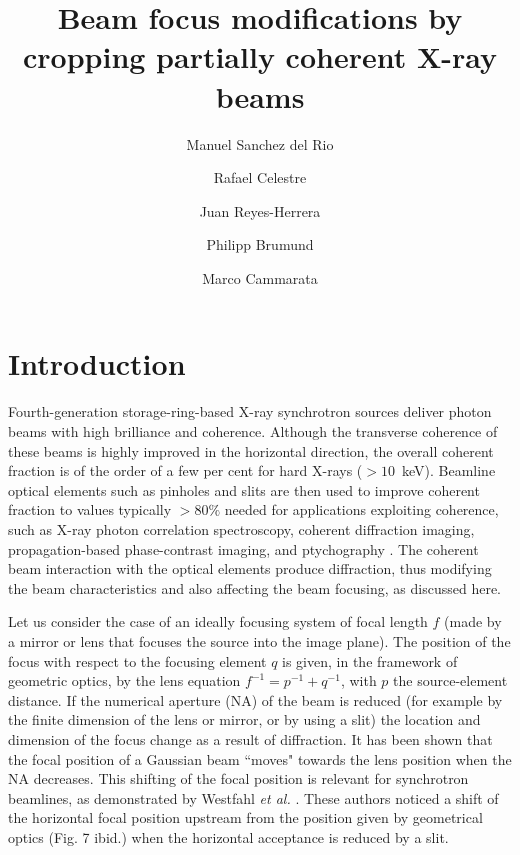 \documentclass[9pt,twocolumn,twoside]{osajnl}
\title{Beam focus modifications by cropping partially coherent X-ray beams}
\author[1*]{Manuel Sanchez del Rio}
\author[1]{Rafael Celestre}
\author[1]{Juan Reyes-Herrera}
\author[1]{Philipp Brumund}
\author[1]{Marco Cammarata}
\affil[1]{European Synchrotron Radiation Facility, 71 Avenue des Martyrs, 38000 Grenoble}
\affil[*]{Corresponding author: srio@esrf.eu}
\begin{document}
\maketitle

\section{Introduction}
\label{sec:introduction}
Fourth-generation storage-ring-based X-ray synchrotron sources deliver photon beams with high brilliance and coherence. Although the transverse coherence of these beams is highly improved in the horizontal direction, 
the overall coherent fraction is of the order of a few per cent for hard X-rays ($>10$~keV). Beamline optical elements such as pinholes and slits are then used to improve coherent fraction to values typically $>80 \%$ needed for applications exploiting coherence, such as X-ray photon correlation spectroscopy, coherent diffraction imaging, propagation-based phase-contrast imaging, and ptychography \cite{paganin_book}. The coherent beam interaction with the optical elements produce diffraction, thus modifying the beam characteristics and also affecting the beam focusing, as discussed here.

Let us consider the case of an ideally focusing system of focal length $f$ (made by a mirror or lens that focuses the source into the image plane). The position of the focus with respect to the focusing element $q$ is given, in the framework of geometric optics, by the lens equation $f^{-1}=p^{-1}+q^{-1}$, with $p$ the source-element distance. If the numerical aperture (NA) of the beam is reduced (for example by the finite dimension of the lens or mirror, or by using a slit) the location and dimension of the focus change as a result of diffraction. It has been shown \cite{Tanaka:85} that the focal position of a Gaussian beam ``moves" towards the lens position when the NA decreases. This shifting of the focal position is relevant for synchrotron beamlines, as demonstrated by Westfahl {\it et al.} \cite{westfahl}. These authors noticed a shift of the horizontal focal position upstream from the position given by geometrical optics (Fig. 7 ibid.) when the horizontal acceptance is reduced by a slit. 
\end{document}
